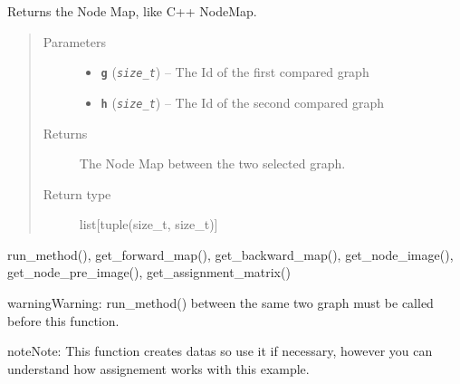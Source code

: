 \documentclass[letterpaper,10pt,english]{sphinxmanual}
\begin{document}
\begin{fulllineitems}
\label{doc:gedlibpy.get_node_map}
Returns the Node Map, like C++ NodeMap.
\begin{quote}\begin{description}
\item[{Parameters}] \leavevmode\begin{itemize}
\item {} 
\textbf{\texttt{g}} (\emph{\texttt{size\_t}}) -- The Id of the first compared graph

\item {} 
\textbf{\texttt{h}} (\emph{\texttt{size\_t}}) -- The Id of the second compared graph

\end{itemize}

\item[{Returns}] \leavevmode
The Node Map between the two selected graph.

\item[{Return type}] \leavevmode
list{[}tuple(size\_t, size\_t){]}

\end{description}\end{quote}




run\_method(), get\_forward\_map(), get\_backward\_map(), get\_node\_image(), get\_node\_pre\_image(), get\_assignment\_matrix()



\begin{notice}{warning}{Warning:}
run\_method() between the same two graph must be called before this function.
\end{notice}

\begin{notice}{note}{Note:}
This function creates datas so use it if necessary, however you can understand how assignement works with this example.
\end{notice}

\end{fulllineitems}

\end{document}
